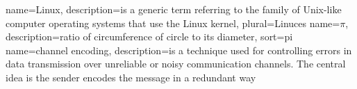 
{
  name=Linux,
  description={is a generic term referring to the family of Unix-like
               computer operating systems that use the Linux kernel},
  plural=Linuces
}
{
  name={\ensuremath{\pi}},
  description={ratio of circumference of circle to its
               diameter},
  sort=pi
}
{
  name=channel encoding,
  description={is a technique used for controlling errors in data transmission over unreliable or noisy communication channels. The central idea is the sender encodes the message in a redundant way}
}
